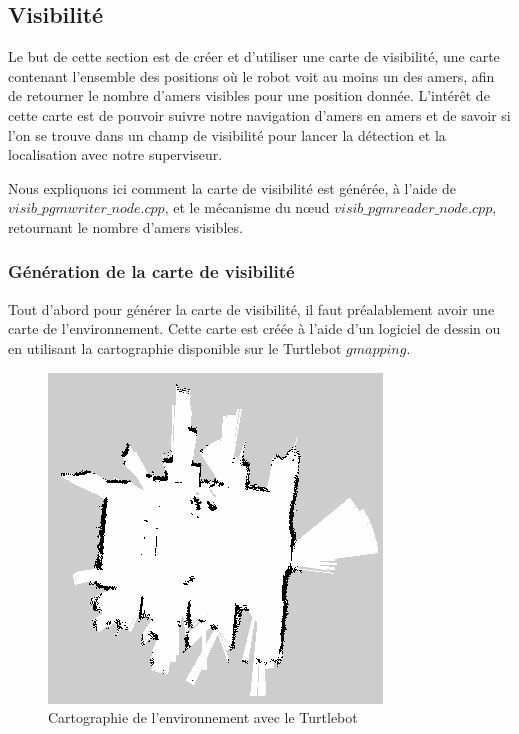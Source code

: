 \documentclass[10pt,a4paper]{article}
\begin{document}
\subsection{Visibilité}
\label{sec:visibilite}

Le but de cette section est de créer et d'utiliser une carte de visibilité, une carte contenant l'ensemble des positions où le robot voit au moins un des amers, afin de retourner le nombre d'amers visibles pour une position donnée. L’intérêt de cette carte est de pouvoir suivre notre navigation d'amers en amers et de savoir si l'on se trouve dans un champ de visibilité pour lancer la détection et la localisation avec notre superviseur.

Nous expliquons ici comment la carte de visibilité est générée, à l'aide de $visib\_pgmwriter\_node.cpp$, et le mécanisme du nœud $visib\_pgmreader\_node.cpp$, retournant le nombre d'amers visibles.

\subsubsection{Génération de la carte de visibilité}
Tout d'abord pour générer la carte de visibilité, il faut préalablement avoir une carte de l'environnement. Cette carte est créée à l'aide d'un logiciel de dessin ou en utilisant la cartographie disponible sur le Turtlebot $gmapping$.

\begin{figure}[!h]
\center
\includegraphics[scale=0.6]{figures/aip_map.png} 
\caption{Cartographie de l'environnement avec le Turtlebot}	
\end{figure}
\end{document}
